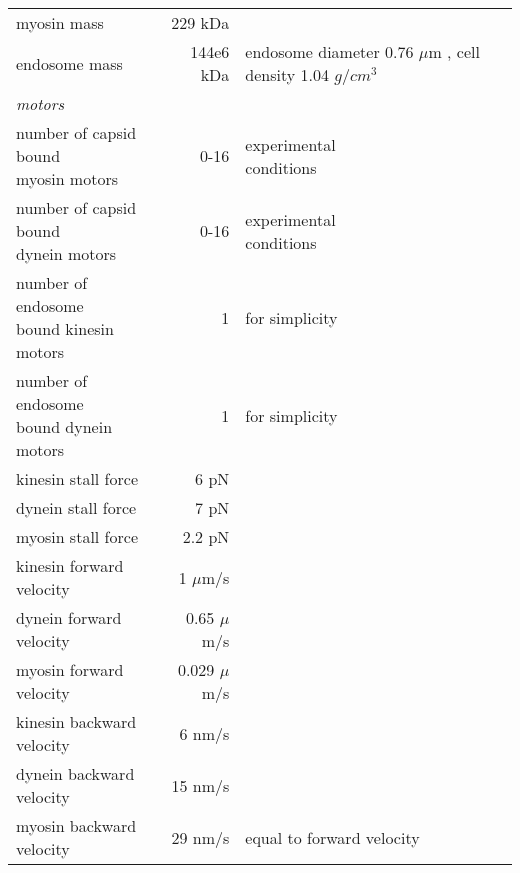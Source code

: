 \begin{longtable}{lrl}
myosin mass &229 kDa & \cite{myosin_mass}\\
endosome mass & 144e6 kDa&\makecell[l]{endosome diameter\\0.76 $\mu$m \cite{ganley2004rab9},\\cell density\\1.04 $g/cm^3$ \cite{ooya1992gravity}}\\
\midrule
\multicolumn{3}{l}{\textit{motors}}\\
\makecell[l]{number of capsid bound\\myosin motors} &0-16 & \makecell[l]{experimental\\conditions}\\
\makecell[l]{number of capsid bound\\dynein motors} &0-16 & \makecell[l]{experimental\\conditions}\\
\makecell[l]{number of endosome\\bound kinesin motors} &1 & for simplicity\\
\makecell[l]{number of endosome\\bound dynein motors} &1 & for simplicity\\
kinesin stall force &6 pN & \cite{muller2008tug}\\
dynein stall force &7 pN & \cite{muller2008tug}\\
myosin stall force &2.2 pN & \cite{norstrom2010unconventional}\\
kinesin forward velocity &1 $\mu$m/s & \cite{muller2008tug}\\
dynein forward velocity &0.65 $\mu$m/s & \cite{muller2008tug}\\
myosin forward velocity &0.029 $\mu$m/s & \cite{norstrom2010unconventional}\\
kinesin backward velocity &6 nm/s & \cite{muller2008tug}\\
dynein backward velocity &15 nm/s & \cite{gennerich2007force}\\
myosin backward velocity &29 nm/s & equal to forward velocity\\
\bottomrule
\end{longtable}